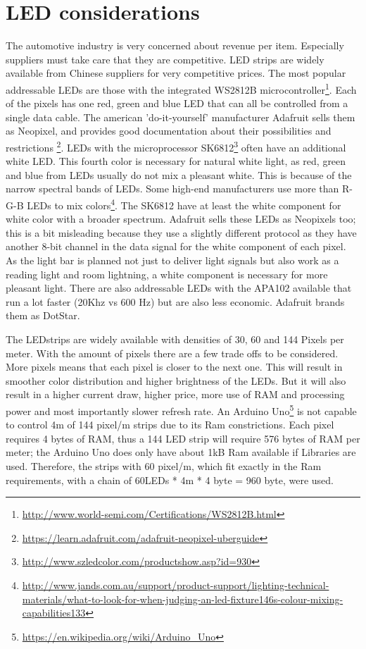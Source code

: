 \section{LED considerations}
\label{sec:LEDconsiderations}
The automotive industry is very concerned about revenue per item. Especially suppliers must take care that they are competitive. LED strips are widely available from Chinese suppliers for very competitive prices. The most popular addressable LEDs are those with the integrated WS2812B microcontroller\footnote{\url{http://www.world-semi.com/Certifications/WS2812B.html}}. Each of the pixels has one red, green and blue LED that can all be controlled from a single data cable. The american 'do-it-yourself' manufacturer Adafruit sells them as Neopixel, and provides good documentation about their possibilities and restrictions \footnote{\url{https://learn.adafruit.com/adafruit-neopixel-uberguide}}. LEDs with the microprocessor SK6812\footnote{\url{http://www.szledcolor.com/productshow.asp?id=930}} often have an additional white LED. This fourth color is necessary for natural white light, as red, green and blue from LEDs usually do not mix a pleasant white. This is because of the narrow spectral bands of LEDs. Some high-end manufacturers use more than R-G-B LEDs to mix colors\footnote{\url{http://www.jands.com.au/support/product-support/lighting-technical-materials/what-to-look-for-when-judging-an-led-fixture146s-colour-mixing-capabilities133}}. The SK6812 have at least the white component for white color with a broader spectrum. Adafruit sells these LEDs as Neopixels too; this is a bit misleading because they use a slightly different protocol as they have another 8-bit channel in the data signal for the white component of each pixel. As the light bar is planned not just to deliver light signals but also work as a reading light and room lightning, a white component is necessary for more pleasant light.  There are also addressable LEDs with the APA102 available that run a lot faster (20Khz vs 600 Hz) but are also less economic. Adafruit brands them as DotStar. 

The LEDstrips are widely available with densities of 30, 60 and 144 Pixels per meter.
With the amount of pixels there are a few trade offs to be considered. More pixels means that each pixel is closer to the next one. This will result in smoother color distribution and higher brightness of the LEDs. But it will also result in a higher current draw, higher price, more use of RAM and processing power and most importantly slower refresh rate. An Arduino Uno\footnote{\url{https://en.wikipedia.org/wiki/Arduino_Uno}} is not capable to control 4m of 144 pixel/m strips due to its Ram constrictions. Each pixel requires 4 bytes of RAM,  thus a 144 LED strip will require 576 bytes of RAM per meter; the Arduino Uno does only have about 1kB Ram available if Libraries are used. Therefore, the strips with 60 pixel/m, which fit exactly in the Ram requirements, with a chain of 60LEDs * 4m * 4 byte = 960 byte, were used.

